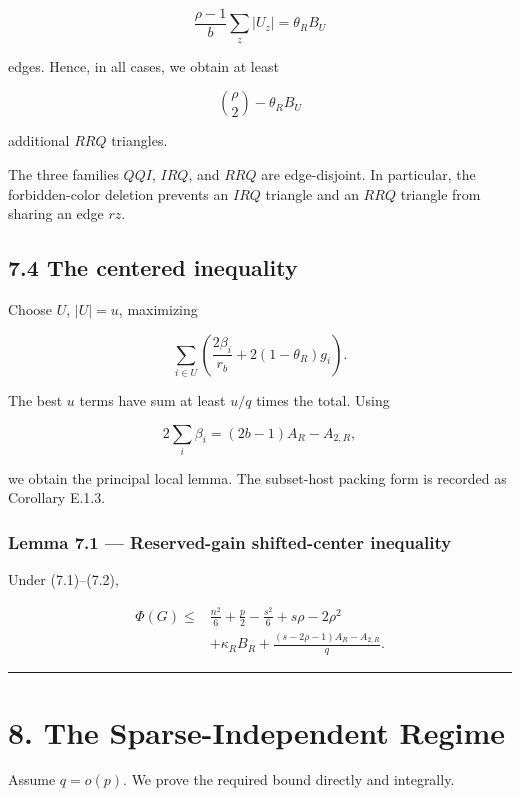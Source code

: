 \documentclass[english,11pt,a4paper]{article}
\begin{document}
\[
\frac{\rho-1}{b}\sum_z|U_z|
=
\theta_RB_U
\]

edges. Hence, in all cases, we obtain at least

\[
\binom\rho2-\theta_RB_U
\]

additional \(RRQ\) triangles.

The three families \(QQI\), \(IRQ\), and \(RRQ\) are edge-disjoint. In
particular, the forbidden-color deletion prevents an \(IRQ\) triangle
and an \(RRQ\) triangle from sharing an edge \(rz\).

\subsection{7.4 The centered inequality}\label{the-centered-inequality}

Choose \(U\), \(|U|=u\), maximizing

\[
\sum_{i\in U}
\left(
\frac{2\beta_i}{r_b}+2(1-\theta_R)g_i
\right).
\]

The best \(u\) terms have sum at least \(u/q\) times the total. Using

\[
2\sum_i\beta_i
=(2b-1)A_R-A_{2,R},
\]

we obtain the principal local lemma. The subset-host packing form is
recorded as Corollary E.1.3.

\subsubsection{Lemma 7.1 --- Reserved-gain shifted-center
inequality}\label{lemma-7.1-reserved-gain-shifted-center-inequality}

Under (7.1)--(7.2),

\[
\boxed{
\begin{aligned}
\Phi(G)
\le{}&
\frac{n^2}{6}+\frac p2-\frac{s^2}{6}
+s\rho-2\rho^2\\
&+
\kappa_RB_R
+
\frac{(s-2\rho-1)A_R-A_{2,R}}q.
\end{aligned}
}
\tag{7.6}
\]

\begin{center}\rule{0.5\linewidth}{0.5pt}\end{center}

\section{8. The Sparse-Independent
Regime}\label{the-sparse-independent-regime}

Assume \(q=o(p)\). We prove the required bound directly and integrally.
\end{document}
